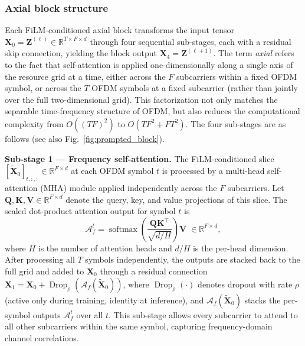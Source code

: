 \documentclass[conference,letterpaper]{IEEEtran}
\begin{document}
	\subsubsection{Axial block structure}
	Each FiLM-conditioned axial block transforms the input tensor $\mathbf{X}_0 = \mathbf{Z}^{(\ell)}\in\mathbb{R}^{T\times F\times d}$ through four sequential sub-stages, each with a residual skip connection, yielding the block output $\mathbf{X}_4 = \mathbf{Z}^{(\ell+1)}$.
	The term \emph{axial} refers to the fact that self-attention is applied one-dimensionally along a single axis of the resource grid at a time, either across the $F$ subcarriers within a fixed OFDM symbol, or across the $T$ OFDM symbols at a fixed subcarrier (rather than jointly over the full two-dimensional grid). This factorization not only matches the separable time-frequency structure of OFDM, but also reduces the computational complexity from $O((TF)^2)$ to $O(T F^2 + F T^2)$.
	The four sub-stages are as follows (see also Fig.~\ref{fig:prompted_block}).
	
	\textbf{Sub-stage 1 --- Frequency self-attention.}
	The FiLM-conditioned slice $[\widetilde{\mathbf{X}}_0]_{t,:,:}\in\mathbb{R}^{F\times d}$ at each OFDM symbol $t$ is processed by a multi-head self-attention (MHA) module applied independently across the $F$ subcarriers.
	Let $\mathbf{Q},\mathbf{K},\mathbf{V}\in\mathbb{R}^{F\times d}$ denote the query, key, and value projections of this slice.
	The scaled dot-product attention output for symbol $t$ is
	\vspace{-.3cm}
	\begin{equation}
		\label{eq:freq_attn}
		\mathcal{A}_{f}^{t}
		=
		\operatorname{softmax}\!\!\left(\frac{\mathbf{Q}\mathbf{K}^{\top}}{\sqrt{d/H}}\right)\mathbf{V}
		\;\in\mathbb{R}^{F\times d},
	\end{equation}
	where $H$ is the number of attention heads and $d/H$ is the per-head dimension.
	After processing all $T$ symbols independently, the outputs are stacked back to the full grid and added to $\mathbf{X}_0$ through a residual connection $	\mathbf{X}_1 = \mathbf{X}_0 + \operatorname{Drop}_\rho(\mathcal{A}_{f}(\widetilde{\mathbf{X}}_0))$,
	where $\operatorname{Drop}_\rho(\cdot)$ denotes dropout with rate $\rho$ (active only during training, identity at inference), and $\mathcal{A}_{f}(\widetilde{\mathbf{X}}_0)$ stacks the per-symbol outputs $\mathcal{A}_{f}^{t}$ over all $t$.
	This sub-stage allows every subcarrier to attend to all other subcarriers within the same symbol, capturing frequency-domain channel correlations.
	
\end{document}

